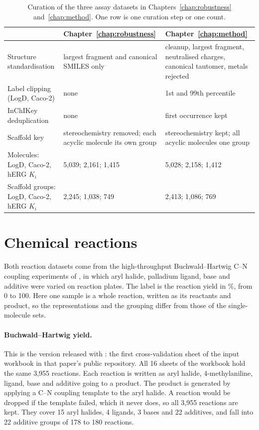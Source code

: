 \begin{table}[htbp]
\centering
\small
\caption{Curation of the three assay datasets in Chapters~\ref{chap:robustness} and~\ref{chap:method}. One row is one curation step or one count.}
\label{tab:curation_ch3_ch5}
\begin{tabular}{p{3.4cm}p{4.8cm}p{4.8cm}}
\toprule
 & Chapter~\ref{chap:robustness} & Chapter~\ref{chap:method} \\
\midrule
Structure standardisation & largest fragment and canonical SMILES only & cleanup, largest fragment, neutralised charges, canonical tautomer, metals rejected \\
Label clipping (LogD, Caco-2) & none & 1st and 99th percentile \\
InChIKey deduplication & none & first occurrence kept \\
Scaffold key & stereochemistry removed; each acyclic molecule its own group & stereochemistry kept; all acyclic molecules one group \\
Molecules: LogD, Caco-2, hERG $K_i$ & 5,039; 2,161; 1,415 & 5,028; 2,158; 1,412 \\
Scaffold groups: LogD, Caco-2, hERG $K_i$ & 2,245; 1,038; 749 & 2,413; 1,086; 769 \\
\bottomrule
\end{tabular}
\end{table}

\section{Chemical reactions}\label{app:datasets:reactions}

Both reaction datasets come from the high-throughput Buchwald--Hartwig C--N coupling experiments of \citet{Ahneman2018}, in which aryl halide, palladium ligand, base and additive were varied on reaction plates. The label is the reaction yield in \%, from 0 to 100. Here one sample is a whole reaction, written as its reactants and product, so the representations and the grouping differ from those of the single-molecule sets.

\paragraph{Buchwald--Hartwig yield.} This is the version released with \citet{Schwaller2021a}: the first cross-validation sheet of the input workbook in that paper's public repository. All 16 sheets of the workbook hold the same 3,955 reactions. Each reaction is written as aryl halide, 4-methylaniline, ligand, base and additive going to a product. The product is generated by applying a C--N coupling template to the aryl halide. A reaction would be dropped if the template failed, which it never does, so all 3,955 reactions are kept. They cover 15 aryl halides, 4 ligands, 3 bases and 22 additives, and fall into 22 additive groups of 178 to 180 reactions.

